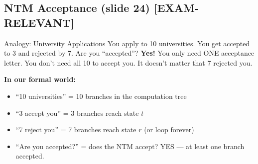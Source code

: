 \documentclass[11pt,a4paper]{article}
\newcommand{\kemark}{\textcolor{red!70!black}{\textbf{[EXAM-RELEVANT]}}}
\begin{document}
\subsection{NTM Acceptance (slide 24) \kemark}

\begin{notebox}{Analogy: University Applications}
You apply to 10 universities. You get accepted to 3 and rejected by 7. Are you ``accepted''? \textbf{Yes!} You only need ONE acceptance letter. You don't need all 10 to accept you. It doesn't matter that 7 rejected you.

\textbf{In our formal world:}
\begin{itemize}[nosep]
\item ``10 universities'' = 10 branches in the computation tree
\item ``3 accept you'' = 3 branches reach state $t$
\item ``7 reject you'' = 7 branches reach state $r$ (or loop forever)
\item ``Are you accepted?'' = does the NTM accept? YES --- at least one branch accepted.
\end{itemize}
\end{notebox}
\end{document}
